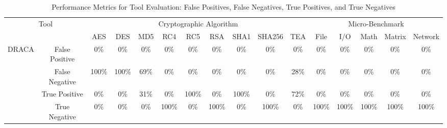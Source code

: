 \begin{table}[htb]
\caption{Performance Metrics for Tool Evaluation: False Positives, False Negatives, True Positives, and True Negatives}
\vspace*{6pt}
\centering
\renewcommand{\arraystretch}{1.4}
\setlength{\tabcolsep}{4pt}
\begin{adjustbox}{max width=\textwidth}
\begin{tabular}{cc|ccccccccc|ccccc}
\hline
\multicolumn{2}{c||}{\multirow{2}{*}{Tool}} & \multicolumn{9}{c|}{Cryptographic Algorithm} & \multicolumn{5}{c}{Micro-Benchmark} \\ \cline{3-16} 
\multicolumn{2}{c||}{} & \multicolumn{1}{c|}{AES} & \multicolumn{1}{c|}{DES} & \multicolumn{1}{c|}{MD5} & \multicolumn{1}{c|}{RC4} & \multicolumn{1}{c|}{RC5} & \multicolumn{1}{c|}{RSA} & \multicolumn{1}{c|}{SHA1} & \multicolumn{1}{c|}{SHA256} & \multicolumn{1}{c|}{TEA} & \multicolumn{1}{c|}{File} & \multicolumn{1}{c|}{I/O} & \multicolumn{1}{c|}{Math} & \multicolumn{1}{c|}{Matrix} & Network\\ \hline\hline
\multicolumn{1}{c|}{\multirow{4}{*}{DRACA}} & \multicolumn{1}{c||}{False Positive} & \multicolumn{1}{c|}{0\%} & \multicolumn{1}{c|}{0\%} & \multicolumn{1}{c|}{0\%} & \multicolumn{1}{c|}{0\%} & \multicolumn{1}{c|}{0\%} & \multicolumn{1}{c|}{0\%} & \multicolumn{1}{c|}{0\%} & \multicolumn{1}{c|}{0\%} & \multicolumn{1}{c|}{0\%} & \multicolumn{1}{c|}{0\%} & \multicolumn{1}{c|}{0\%} & \multicolumn{1}{c|}{0\%} & \multicolumn{1}{c|}{0\%} & 0\% \\ \cline{2-16} 
\multicolumn{1}{c|}{} & \multicolumn{1}{c||}{False Negative} & \multicolumn{1}{c|}{100\%} & \multicolumn{1}{c|}{100\%} & \multicolumn{1}{c|}{69\%} & \multicolumn{1}{c|}{0\%} & \multicolumn{1}{c|}{0\%} & \multicolumn{1}{c|}{0\%} & \multicolumn{1}{c|}{0\%} & \multicolumn{1}{c|}{0\%} & \multicolumn{1}{c|}{28\%} & \multicolumn{1}{c|}{0\%} & \multicolumn{1}{c|}{0\%} & \multicolumn{1}{c|}{0\%} & \multicolumn{1}{c|}{0\%} & 0\% \\ \cline{2-16} 
\multicolumn{1}{c|}{} & \multicolumn{1}{c||}{True Positive} & \multicolumn{1}{c|}{0\%} & \multicolumn{1}{c|}{0\%} & \multicolumn{1}{c|}{31\%} & \multicolumn{1}{c|}{0\%} & \multicolumn{1}{c|}{100\%} & \multicolumn{1}{c|}{0\%} & \multicolumn{1}{c|}{100\%} & \multicolumn{1}{c|}{0\%} & \multicolumn{1}{c|}{72\%} & \multicolumn{1}{c|}{0\%} & \multicolumn{1}{c|}{0\%} & \multicolumn{1}{c|}{0\%} & \multicolumn{1}{c|}{0\%} & 0\% \\ \cline{2-16} 
\multicolumn{1}{c|}{} & \multicolumn{1}{c||}{True Negative} & \multicolumn{1}{c|}{0\%} & \multicolumn{1}{c|}{0\%} & \multicolumn{1}{c|}{0\%} & \multicolumn{1}{c|}{100\%} & \multicolumn{1}{c|}{0\%} & \multicolumn{1}{c|}{100\%} & \multicolumn{1}{c|}{0\%} & \multicolumn{1}{c|}{100\%} & \multicolumn{1}{c|}{0\%} & \multicolumn{1}{c|}{100\%} & \multicolumn{1}{c|}{100\%} & \multicolumn{1}{c|}{100\%} & \multicolumn{1}{c|}{100\%} & 100\% \\ \hline

\end{tabular}
\end{adjustbox}
\end{table}
